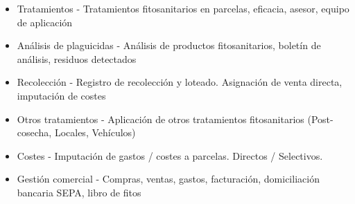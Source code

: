 \begin{itemize}
\begin{itemize}
\item Tratamientos - Tratamientos fitosanitarios en parcelas, eficacia, asesor, equipo de aplicación
\item Análisis de plaguicidas - Análisis de productos fitosanitarios, boletín de análisis, residuos detectados
\item Recolección - Registro de recolección y loteado. Asignación de venta directa, imputación de costes
\item Otros tratamientos - Aplicación de otros tratamientos fitosanitarios (Post-cosecha, Locales, Vehículos)
\item Costes - Imputación de gastos / costes a parcelas. Directos / Selectivos.
\item Gestión comercial - Compras, ventas, gastos, facturación, domiciliación bancaria SEPA, libro de fitos 
\end{itemize}
\end{itemize}